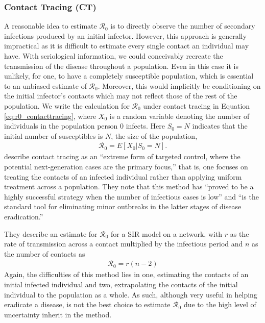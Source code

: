 \documentclass[12pt]{article}
\newcommand{\rr}{\ensuremath{\mathcal{R}_0}}
\begin{document}
\subsubsection{Contact Tracing (CT)}
\label{sec:contact_tracing}
A reasonable idea to estimate $\rr$ is to directly observe the number of secondary infections produced by an initial infector.  However, this approach is generally impractical as it is difficult to estimate every single contact an individual may have.   With seriological information, we could conceivably recreate the transmission of the disease throughout a population.  Even in this case it is unlikely, for one, to have a completely susceptible population, which is essential to an unbiased estimate of $\rr$.  Moreover, this would implicitly be conditioning on the initial infector's contacts which may not reflect those of the rest of the population.  We write the calculation for $\rr$ under contact tracing in Equation \ref{eq:r0_contacttracing}, where $X_0$ is a random variable denoting the number of individuals in the population person 0 infects.  Here $S_0=N$ indicates that the initial number of susceptibles is $N$, the size of the population,
\begin{align}\label{eq:r0_contacttracing}
\rr = E[ X_0 | S_0 = N].
\end{align}
\cite{eames2003} describe contact tracing as an ``extreme form of targeted control, where the potential next-generation cases are the primary focus,'' that is, one focuses on treating the contacts of an infected individual rather than applying uniform treatment across a population.  They note that this method has ``proved to be a highly successful strategy when the number of infectious cases is low'' and ``is the standard tool for eliminating minor outbreaks in the latter stages of disease eradication.''

They describe an estimate for $\rr$ for a SIR model on a network, with $r$ as the rate of transmission across a contact multiplied by the infectious period and $n$ as the number of contacts as
\begin{align*}
\rr = r(n-2)
\end{align*}
Again, the difficulties of this method lies in one, estimating the contacts of an initial infected individual and two, extrapolating the contacts of the initial individual to the population as a whole.  As such, although very useful in helping eradicate a disease, is not the best choice to estimate $\rr$ due to the high level of uncertainty inherit in the method.
\end{document}
